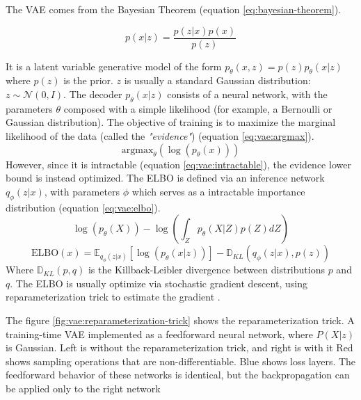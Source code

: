 \documentclass[12pt]{report}
\begin{document}
The VAE \cite{doersch_tutorial_2016, noauthor_variational_nodate, noauthor_tutorial_nodate, akrami_robust_2019, liu_towards_2020} comes from the Bayesian Theorem (equation \ref{eq:bayesian-theorem}).

\begin{equation}
    p(x|z) = \frac{p(z|x) p(x)}{p(z)}
    \label{eq:bayesian-theorem}
\end{equation}

It is a latent variable generative model of the form $p_{\theta}(x, z) = p(z)p_{\theta}(x|z)$ where $p(z)$ is the prior.
$z$ is usually a standard Gaussian distribution: $z \sim \mathcal{N} (0, I)$.
The decoder $p_{\theta}(x|z)$ consists of a neural network, with the parameters $\theta$ composed with a simple likelihood (for example, a Bernoulli or Gaussian distribution).
The objective of training is to maximize the marginal likelihood of the data (called the \textit{"evidence"}) (equation \ref{eq:vae:argmax}).
\begin{equation}
    \text{argmax}_{\theta} (\log(p_{\theta} (x)))
    \label{eq:vae:argmax}
\end{equation}
However, since it is intractable (equation \ref{eq:vae:intractable}), the evidence lower bound is instead optimized. The ELBO is defined via an inference network $q_{\phi}(z|x)$, with parameters $\phi$ which serves as a intractable importance distribution (equation \ref{eq:vae:elbo}).
\begin{equation}
    \log (p_{\theta} (X)) - \log \left( \int_{Z} p_{\theta} (X|Z) p(Z) dZ\right)
    \label{eq:vae:intractable}
\end{equation}
\begin{equation}
    \text{ELBO}(x) = \mathbb{E}_{q_{\phi}(z|x)} \left[ \log (p_{\theta}(x|z)) \right] - \mathbb{D}_{KL} \left( q_{\phi}(z|x), p(z) \right)
    \label{eq:vae:elbo}
\end{equation}
Where $\mathbb{D}_{KL}(p, q)$ is the Killback-Leibler divergence between distributions $p$ and $q$.
The ELBO is usually optimize via stochastic gradient descent, using reparameterization trick to estimate the gradient \cite{kingma_auto-encoding_2014}.

The figure \ref{fig:vae:reparameterization-trick} shows the reparameterization trick.
A training-time VAE implemented as a feedforward neural network, where $P(X|z)$ is Gaussian.
Left is without the reparameterization trick, and right is with it
Red shows sampling operations that are non-differentiable.
Blue shows loss layers.
The feedforward behavior of these networks is identical, but the backpropagation can be applied only to the right network
\end{document}
